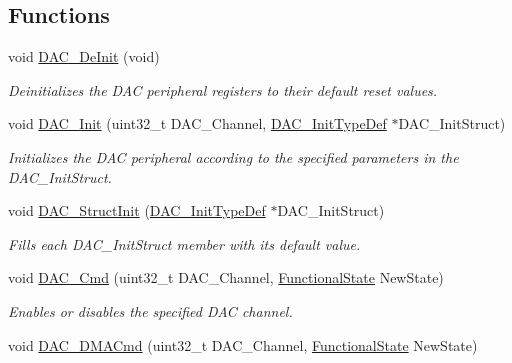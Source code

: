 \subsection*{Functions}
\begin{DoxyCompactItemize}
\item 
void \hyperlink{group___d_a_c___exported___functions_ga1fae225204e1e049d6795319e99ba8bc}{D\+A\+C\+\_\+\+De\+Init} (void)
\begin{DoxyCompactList}\small\item\em Deinitializes the D\+AC peripheral registers to their default reset values. \end{DoxyCompactList}\item 
void \hyperlink{group___d_a_c___exported___functions_ga7c59850468ed4bf0659663fe495441da}{D\+A\+C\+\_\+\+Init} (uint32\+\_\+t D\+A\+C\+\_\+\+Channel, \hyperlink{struct_d_a_c___init_type_def}{D\+A\+C\+\_\+\+Init\+Type\+Def} $\ast$D\+A\+C\+\_\+\+Init\+Struct)
\begin{DoxyCompactList}\small\item\em Initializes the D\+AC peripheral according to the specified parameters in the D\+A\+C\+\_\+\+Init\+Struct. \end{DoxyCompactList}\item 
void \hyperlink{group___d_a_c___exported___functions_gadfc270974d54cb5fa5f92556015c4046}{D\+A\+C\+\_\+\+Struct\+Init} (\hyperlink{struct_d_a_c___init_type_def}{D\+A\+C\+\_\+\+Init\+Type\+Def} $\ast$D\+A\+C\+\_\+\+Init\+Struct)
\begin{DoxyCompactList}\small\item\em Fills each D\+A\+C\+\_\+\+Init\+Struct member with its default value. \end{DoxyCompactList}\item 
void \hyperlink{group___d_a_c___exported___functions_ga323e61530d7fa9396c3bce9edb61f733}{D\+A\+C\+\_\+\+Cmd} (uint32\+\_\+t D\+A\+C\+\_\+\+Channel, \hyperlink{group___exported__types_gac9a7e9a35d2513ec15c3b537aaa4fba1}{Functional\+State} New\+State)
\begin{DoxyCompactList}\small\item\em Enables or disables the specified D\+AC channel. \end{DoxyCompactList}\item 
void \hyperlink{group___d_a_c___exported___functions_ga194cba38f60ace11658824f0250121f4}{D\+A\+C\+\_\+\+D\+M\+A\+Cmd} (uint32\+\_\+t D\+A\+C\+\_\+\+Channel, \hyperlink{group___exported__types_gac9a7e9a35d2513ec15c3b537aaa4fba1}{Functional\+State} New\+State)

\end{DoxyCompactItemize}
